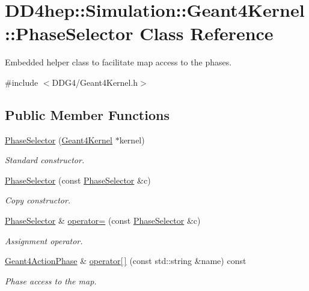 \hypertarget{class_d_d4hep_1_1_simulation_1_1_geant4_kernel_1_1_phase_selector}{
\section{DD4hep::Simulation::Geant4Kernel::PhaseSelector Class Reference}
\label{class_d_d4hep_1_1_simulation_1_1_geant4_kernel_1_1_phase_selector}
}


Embedded helper class to facilitate map access to the phases.  


{\ttfamily \#include $<$DDG4/Geant4Kernel.h$>$}\subsection*{Public Member Functions}
\begin{DoxyCompactItemize}
\item 
\hyperlink{class_d_d4hep_1_1_simulation_1_1_geant4_kernel_1_1_phase_selector_a3a641f53e3730efcff6eba4a42d509d1}{PhaseSelector} (\hyperlink{class_d_d4hep_1_1_simulation_1_1_geant4_kernel}{Geant4Kernel} $\ast$kernel)
\begin{DoxyCompactList}\small\item\em Standard constructor. \item\end{DoxyCompactList}\item 
\hyperlink{class_d_d4hep_1_1_simulation_1_1_geant4_kernel_1_1_phase_selector_ab5629568686973076ca92c67f24351ee}{PhaseSelector} (const \hyperlink{class_d_d4hep_1_1_simulation_1_1_geant4_kernel_1_1_phase_selector}{PhaseSelector} \&c)
\begin{DoxyCompactList}\small\item\em Copy constructor. \item\end{DoxyCompactList}\item 
\hyperlink{class_d_d4hep_1_1_simulation_1_1_geant4_kernel_1_1_phase_selector}{PhaseSelector} \& \hyperlink{class_d_d4hep_1_1_simulation_1_1_geant4_kernel_1_1_phase_selector_a6f83dcf657b82c81042ccdd9e994088d}{operator=} (const \hyperlink{class_d_d4hep_1_1_simulation_1_1_geant4_kernel_1_1_phase_selector}{PhaseSelector} \&c)
\begin{DoxyCompactList}\small\item\em Assignment operator. \item\end{DoxyCompactList}\item 
\hyperlink{class_d_d4hep_1_1_simulation_1_1_geant4_action_phase}{Geant4ActionPhase} \& \hyperlink{class_d_d4hep_1_1_simulation_1_1_geant4_kernel_1_1_phase_selector_a7d247eeafe80c6b10dfefe393507f008}{operator\mbox{[}$\,$\mbox{]}} (const std::string \&name) const 
\begin{DoxyCompactList}\small\item\em Phase access to the map. \item\end{DoxyCompactList}\end{DoxyCompactItemize}
